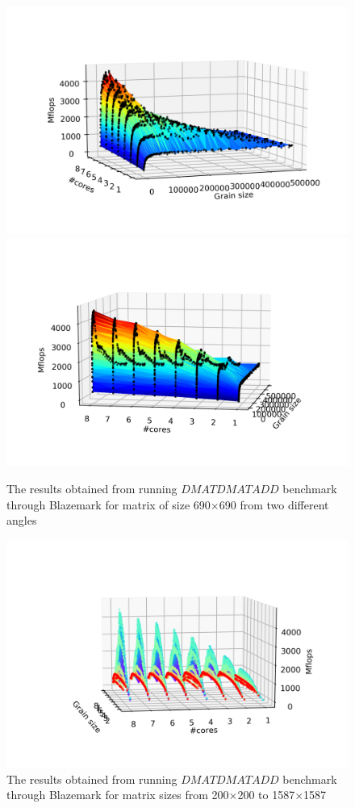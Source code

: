\begin{figure}[H]
	\centering
	\includegraphics[width=1\linewidth]{images/fig2.png}
	\includegraphics[width=1\linewidth]{images/fig3.png}
	\caption{The results obtained from running $DMATDMATADD$ benchmark through Blazemark for matrix of size 690$\times$690 from two different angles}	
	\label{fig1}
\end{figure}

\begin{figure}[H]
	\centering
	\includegraphics[width=1\linewidth]{images/fig4.png}
	\caption{The results obtained from running $DMATDMATADD$ benchmark through Blazemark for matrix sizes from 200$\times$200 to 1587$\times$1587}	
	\label{fig4}
\end{figure}


